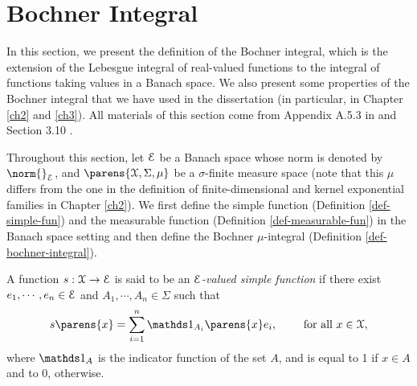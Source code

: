 

\section{Bochner Integral}\label{section-bochner-integral}

In this section, we present the definition of the Bochner integral, which is the extension of the Lebesgue integral of real-valued functions to the integral of functions taking values in a Banach space. We also present some properties of the Bochner integral that we have used in the dissertation (in particular, in Chapter \ref{ch2} and \ref{ch3}). All materials of this section come from Appendix A.5.3 in \textcite{Steinwart2008-tn} and Section 3.10 \textcite{Denkowski2013-ke}. 

Throughout this section, let $\mathcal{E}$ be a Banach space whose norm is denoted by $\norm{}_{\calE}$, and $\parens{\calX, \Sigma, \mu}$ be a $\sigma$-finite measure space (note that this $\mu$ differs from the one in the definition of finite-dimensional and kernel exponential families in Chapter \ref{ch2}). We first define the simple function (Definition \ref{def-simple-fun}) and the measurable function (Definition \ref{def-measurable-fun}) in the Banach space setting  and then define the Bochner $\mu$-integral (Definition \ref{def-bochner-integral}). 

\begin{definition}\label{def-simple-fun}
	A function $s: \mathcal{X} \to \mathcal{E}$ is said to be an \textit{$\mathcal{E}$-valued simple function} if there exist $e_1, \cdots, e_n \in \mathcal{E}$ and $A_1, \cdots, A_n \in \Sigma$ such that 
	\begin{align*}
		s \parens{x} = \sum_{i=1}^n \indic_{A_i} \parens{x} e_i, \qquad \text{ for all } x \in \calX, 
	\end{align*}
	where $\indic_A$ is the indicator function of the set $A$, and is equal to 1 if $x \in A$ and to 0, otherwise. 
\end{definition}

